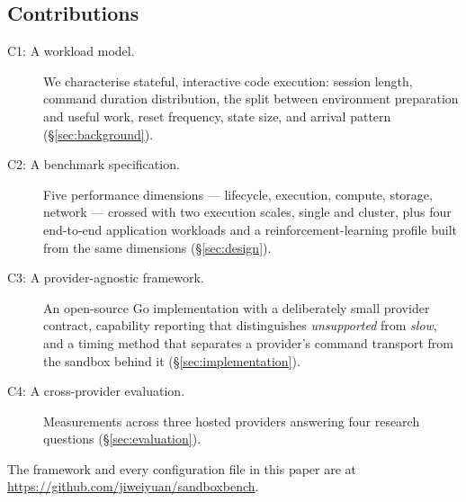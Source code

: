 \subsection*{Contributions}

\begin{description}
  \item[C1: A workload model.] We characterise stateful, interactive code
  execution: session length, command duration distribution, the split between
  environment preparation and useful work, reset frequency, state size, and
  arrival pattern (\S\ref{sec:background}). 
  \item[C2: A benchmark specification.] Five performance dimensions ---
  lifecycle, execution, compute, storage, network --- crossed with two
  execution scales, single and cluster, plus four end-to-end application
  workloads and a reinforcement-learning profile built from the same
  dimensions (\S\ref{sec:design}).
  \item[C3: A provider-agnostic framework.] An open-source Go implementation
  with a deliberately small provider contract, capability reporting that
  distinguishes \emph{unsupported} from \emph{slow}, and a timing method that
  separates a provider's command transport from the sandbox behind it
  (\S\ref{sec:implementation}).
  \item[C4: A cross-provider evaluation.] Measurements across three hosted
  providers answering four research questions (\S\ref{sec:evaluation}).
\end{description}

The framework and every configuration file in this paper are at
\url{https://github.com/jiweiyuan/sandboxbench}.
